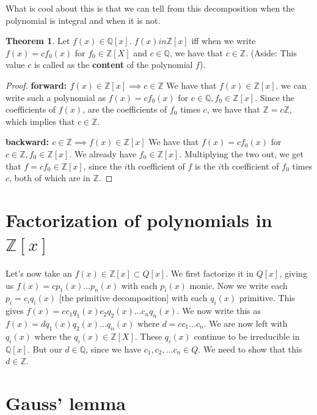 \documentclass{book}
\newcommand{\Z}{\ensuremath{\mathbb{Z}}}
\newcommand{\Q}{\ensuremath{\mathbb{Q}}}
\theoremstyle{definition}
\newtheorem{theorem}{Theorem}
\begin{document}
What is cool about this is that we can tell from this decomposition when
the polynomial is integral and when it is not.
\begin{theorem}
Let $f(x) \in \Q[x]$.
$f(x)  in \Z[x]$ iff when we write $f(x) = c f_0(x)$ for $f_0 \in \Z[X]$ and $c \in \Q$, we
have that $c \in \Z$. (Aside: This value $c$ is called as the \textbf{content} 
of the polynomial $f$).
\end{theorem}
\begin{proof}
    \textbf{forward: $f(x) \in \Z[x] \implies c \in \Z$}
    We have that $f(x) \in \Z[x]$. 
    we can write such a polynomial as $f(x) = c f_0(x)$ for $c \in \Q, f_0 \in \Z[x]$.
    Since the coefficients of $f(x)$, are the
    coefficients of $f_0$ times $c$, we have that $\Z = c \Z$, which
    implies that $c \in \Z$.

    \textbf{backward: $c \in \Z \implies f(x) \in \Z[x]$}
    We have that $f(x) = c f_0(x)$ for $c \in \Z, f_0 \in \Z[x]$.
    We already have $f_0 \in \Z[x]$. Multiplying the two
    out, we get that $f = c f_0 \in \Z[x]$, since the $i$th coefficient
    of $f$ is the $i$th coefficient of $f_0$ times $c$, both of which are in $\Z$.
\end{proof}

\section{Factorization of polynomials in $\Z[x]$}

Let's now take an $f(x) \in \Z[x] \subset Q[x]$. We first factorize it in $Q[x]$,
giving us $f(x) = c p_1(x) \dots p_n(x)$ with each $p_i(x)$ monic.
Now we write each $p_i = c_i q_i(x)$
[the primitive decomposition] with each $q_i(x)$ primitive.
This gives $f(x) = c c_1 q_1(x) c_2 q_2(x) \dots c_n q_n(x)$.
We now write this as $f(x) = d q_1(x) q_2(x) \dots q_n(x)$ where $d = c c_1 \dots c_n$.
We are now left with $q_i(x)$ where the $q_i(x) \in \Z[X]$. These $q_i(x)$
continue to be irreducible in $\Q[x]$. But our $d \in \Q$, since we have
$c_1, c_2, \dots c_n \in Q$. We need to show that this $d \in \Z$.

\section{Gauss' lemma}
\end{document}

